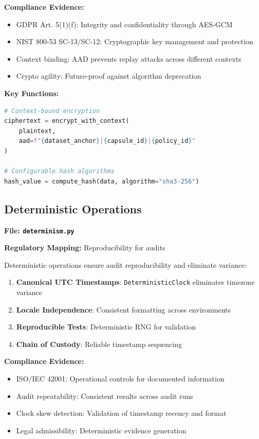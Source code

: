 \documentclass[11pt,a4paper]{article}
\begin{document}
\textbf{Compliance Evidence:}
\begin{itemize}
    \item GDPR Art. 5(1)(f): Integrity and confidentiality through AES-GCM
    \item NIST 800-53 SC-13/SC-12: Cryptographic key management and protection
    \item Context binding: AAD prevents replay attacks across different contexts
    \item Crypto agility: Future-proof against algorithm deprecation
\end{itemize}

\textbf{Key Functions:}
\begin{lstlisting}[language=Python]
# Context-bound encryption
ciphertext = encrypt_with_context(
    plaintext, 
    aad=f"{dataset_anchor}|{capsule_id}|{policy_id}"
)

# Configurable hash algorithms
hash_value = compute_hash(data, algorithm="sha3-256")
\end{lstlisting}

\subsection{Deterministic Operations}
\textbf{File: \texttt{determinism.py}}

\textbf{Regulatory Mapping:} Reproducibility for audits

Deterministic operations ensure audit reproducibility and eliminate variance:

\begin{enumerate}
    \item \textbf{Canonical UTC Timestamps}: \texttt{DeterministicClock} eliminates timezone variance
    \item \textbf{Locale Independence}: Consistent formatting across environments
    \item \textbf{Reproducible Tests}: Deterministic RNG for validation
    \item \textbf{Chain of Custody}: Reliable timestamp sequencing
\end{enumerate}

\textbf{Compliance Evidence:}
\begin{itemize}
    \item ISO/IEC 42001: Operational controls for documented information
    \item Audit repeatability: Consistent results across audit runs
    \item Clock skew detection: Validation of timestamp recency and format
    \item Legal admissibility: Deterministic evidence generation
\end{itemize}
\end{document}
